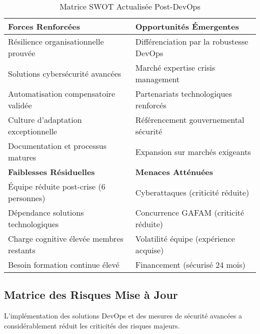 \documentclass[12pt,a4paper]{article}
\begin{document}
\begin{table}[H]
\centering
\caption{Matrice SWOT Actualisée Post-DevOps}
\begin{tabular}{|p{6cm}|p{6cm}|}
\hline
\rowcolor{green!20}
\textbf{Forces Renforcées} & \textbf{Opportunités Émergentes} \\
\hline
Résilience organisationnelle prouvée & Différenciation par la robustesse DevOps \\
Solutions cybersécurité avancées & Marché expertise crisis management \\
Automatisation compensatoire validée & Partenariats technologiques renforcés \\
Culture d'adaptation exceptionnelle & Référencement gouvernemental sécurité \\
Documentation et processus matures & Expansion sur marchés exigeants \\
\hline
\rowcolor{red!20}
\textbf{Faiblesses Résiduelles} & \textbf{Menaces Atténuées} \\
\hline
Équipe réduite post-crise (6 personnes) & Cyberattaques (criticité réduite) \\
Dépendance solutions technologiques & Concurrence GAFAM (criticité réduite) \\
Charge cognitive élevée membres restants & Volatilité équipe (expérience acquise) \\
Besoin formation continue élevé & Financement (sécurisé 24 mois) \\
\hline
\end{tabular}
\end{table}

\subsection{Matrice des Risques Mise à Jour}

L'implémentation des solutions DevOps et des mesures de sécurité avancées a considérablement réduit les criticités des risques majeurs.
\end{document}
